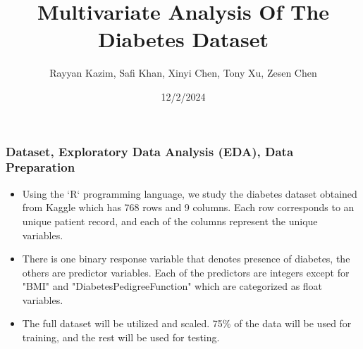 \documentclass{beamer}
\title{Multivariate Analysis Of The Diabetes Dataset}
\author{Rayyan Kazim, Safi Khan, Xinyi Chen, Tony Xu, Zesen Chen}
\institute{McMaster University}
\date{12/2/2024}
\begin{document}
\frame{\titlepage}

\begin{frame}
\frametitle{Dataset, Exploratory Data Analysis (EDA), Data Preparation}
\begin{itemize}
    \setlength\itemsep{1em}
    \item Using the `R` programming language, we study the diabetes dataset obtained from Kaggle which has 768 rows and 9 columns. Each row corresponds to an unique patient record, and each of the columns represent the unique variables. 
    \item There is one binary response variable that denotes presence of diabetes, the others are predictor variables. Each of the predictors are integers except for "BMI" and "DiabetesPedigreeFunction" which are categorized as float variables.
    \item The full dataset will be utilized and scaled. 75\% of the data will be used for training, and the rest will be used for testing.
\end{itemize}
\end{frame}


\end{document}
